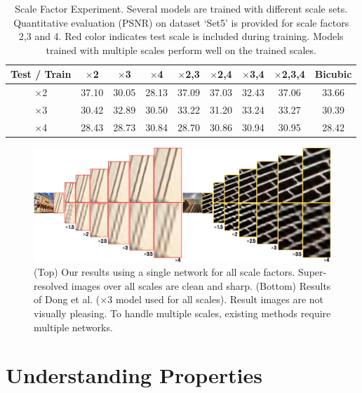 \documentclass[10pt,twocolumn,letterpaper]{article}
\begin{document}
\begin{table}[t]
	\small
	\centering
\begin{tabular}
{|c|c|c|c|c|c|c|c||c|}
\hline 
 Test / Train & {$\times$2}& {$\times$3}& { $\times$4}& {$\times$2,3}& {$\times$2,4}& { $\times$3,4}& {$\times$2,3,4} & {Bicubic} \\
\hline
$\times$2  & \color{red} 37.10  & 30.05  & 28.13  & \color{red} 37.09  & \color{red} 37.03  & 32.43  & \color{red}37.06 &33.66   \\
$\times$3  & 30.42  & \color{red} 32.89  & 30.50  & \color{red} 33.22  & 31.20  & \color{red} 33.24  & \color{red} 33.27  & 30.39 \\
$\times$4  & 28.43  & 28.73  & \color{red} 30.84  & 28.70  & \color{red} 30.86  & \color{red} 30.94  & \color{red} 30.95 & 28.42  \\
\hline
\end{tabular}
	\vspace{1pt}
	\caption{Scale Factor Experiment. Several models are trained with different scale sets. Quantitative evaluation (PSNR) on dataset `Set5' is provided for scale factors 2,3 and 4.  {\color{red}Red color} indicates test scale is included during training. Models trained with multiple scales perform well on the trained scales. }
	\label{tab:SRCNN_Factor_Test}
\end{table}


\begin{figure}
\vspace{-.5cm}
\includegraphics[width=\textwidth]{figs/fig1_sffsr.pdf}
\caption{(Top) Our results using a single network for all scale factors. Super-resolved images over all scales are clean and sharp. (Bottom)  Results of Dong et al.  \cite{Dong2014} ($\times$3 model used for all scales). Result images are not visually pleasing. To handle multiple scales, existing methods require multiple networks.}
\end{figure}




\section{Understanding Properties}
\end{document}
